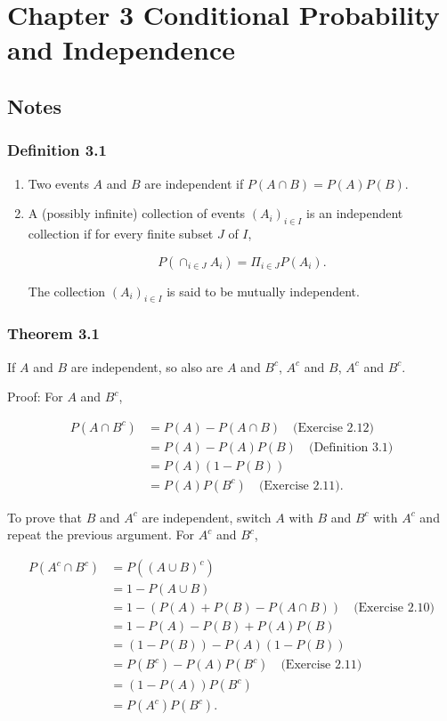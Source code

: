 \documentclass{article}
\begin{document}
\newpage 
\section*{Chapter 3 Conditional Probability and Independence}

\subsection*{Notes}

\subsubsection*{Definition 3.1} 
\begin{enumerate}
\item Two events $A$ and $B$ are independent if $P(A\cap B) = P(A)P(B)$. 

\item A (possibly infinite) collection of events $(A_i)_{i\in I}$ is an independent collection if for every finite subset $J$ of $I$,

$$
P\left(\cap_{i \in J} A_i \right) = \Pi_{i \in J} P(A_i).
$$

The collection $(A_i)_{i \in I}$ is said to be mutually independent. 
\end{enumerate}

\subsubsection*{Theorem 3.1} If $A$ and $B$ are independent, so also are $A$ and $B^c$, $A^c$ and $B$, $A^c$ and $B^c$. 

Proof: For $A$ and $B^c$,

\begin{align*}
P(A \cap B^c) &= P(A) - P(A\cap B) \quad \text{(Exercise 2.12)} \\
&= P(A) - P(A)P(B) \quad \text{(Definition 3.1)} \\
&= P(A)(1-P(B)) \\
&= P(A)P(B^c) \quad \text{(Exercise 2.11)}.
\end{align*}

To prove that $B$ and $A^c$ are independent, switch $A$ with $B$ and $B^c$ with $A^c$ and repeat the previous argument. For $A^c$ and $B^c$,

\begin{align*}
P(A^c \cap B^c) &= P((A \cup B)^c)  \\
&= 1 - P(A\cup B) \\
&= 1 - (P(A) + P(B) - P(A\cap B)) \quad \text{(Exercise 2.10)} \\
&= 1 - P(A) - P(B) + P(A)P(B) \\
&= (1-P(B))-P(A)(1-P(B))  \\
&= P(B^c) - P(A)P(B^c) \quad \text{(Exercise 2.11)} \\
&= (1 - P(A))P(B^c) \\
&= P(A^c)P(B^c).
\end{align*}
\end{document}
